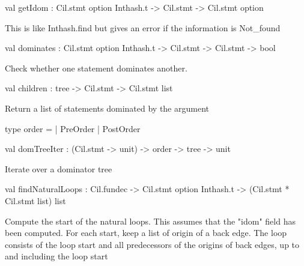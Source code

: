 \documentclass[11pt]{article}
\begin{document}
\label{val:Dominators.getIdom}\begin{ocamldoccode}
val getIdom : Cil.stmt option Inthash.t -> Cil.stmt -> Cil.stmt option
\end{ocamldoccode}
\begin{ocamldocdescription}
This is like Inthash.find but gives an error if the information is 
 Not\_found


\end{ocamldocdescription}




\label{val:Dominators.dominates}\begin{ocamldoccode}
val dominates : Cil.stmt option Inthash.t -> Cil.stmt -> Cil.stmt -> bool
\end{ocamldoccode}
\begin{ocamldocdescription}
Check whether one statement dominates another.


\end{ocamldocdescription}




\label{val:Dominators.children}\begin{ocamldoccode}
val children : tree -> Cil.stmt -> Cil.stmt list
\end{ocamldoccode}
\begin{ocamldocdescription}
Return a list of statements dominated by the argument


\end{ocamldocdescription}




\label{type:Dominators.order}\begin{ocamldoccode}
type order =
  | PreOrder
  | PostOrder
\end{ocamldoccode}




\label{val:Dominators.domTreeIter}\begin{ocamldoccode}
val domTreeIter : (Cil.stmt -> unit) -> order -> tree -> unit
\end{ocamldoccode}
\begin{ocamldocdescription}
Iterate over a dominator tree


\end{ocamldocdescription}




\label{val:Dominators.findNaturalLoops}\begin{ocamldoccode}
val findNaturalLoops :
  Cil.fundec -> Cil.stmt option Inthash.t -> (Cil.stmt * Cil.stmt list) list
\end{ocamldoccode}
\begin{ocamldocdescription}
Compute the start of the natural loops. This assumes that the "idom" 
 field has been computed. For each start, keep a list of origin of a back 
 edge. The loop consists of the loop start and all predecessors of the 
 origins of back edges, up to and including the loop start


\end{ocamldocdescription}
\end{document}
